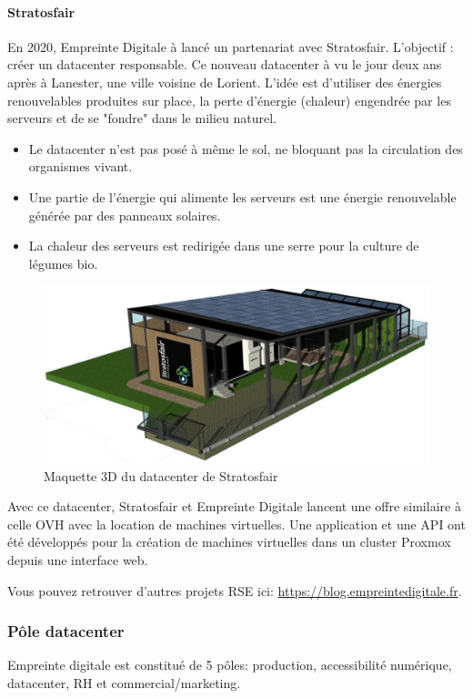 \documentclass[12pt]{article}
\begin{document}
\paragraph{Stratosfair}
En 2020, Empreinte Digitale à lancé un partenariat avec Stratosfair. 
L'objectif : créer un datacenter responsable. 
Ce nouveau datacenter à vu le jour deux ans après à Lanester, une ville voisine de Lorient. 
L'idée est d'utiliser des énergies renouvelables produites sur place, la perte d'énergie (chaleur) engendrée par les serveurs et de se "fondre" dans le milieu naturel.
\begin{itemize}
    \item Le datacenter n'est pas posé à même le sol, ne bloquant pas la circulation des organismes vivant.
    \item Une partie de l'énergie qui alimente les serveurs est une énergie renouvelable générée par des panneaux solaires.
    \item La chaleur des serveurs est redirigée dans une serre pour la culture de légumes bio.
\end{itemize}

\begin{figure}[!ht]
    \centering
    \includegraphics[width=\textwidth]{src/strato.jpg}
    \caption{Maquette 3D du datacenter de Stratosfair}
    \label{fig:strato}
\end{figure}

Avec ce datacenter, Stratosfair et Empreinte Digitale lancent une offre similaire à celle OVH avec la location de machines virtuelles.
Une application et une API ont été développés pour la création de machines virtuelles dans un cluster Proxmox depuis une interface web.

Vous pouvez retrouver d'autres projets RSE ici: \url{https://blog.empreintedigitale.fr}.

\subsubsection{Pôle datacenter}
Empreinte digitale est constitué de 5 pôles: production, accessibilité numérique, datacenter, RH et commercial/marketing.
\end{document}
